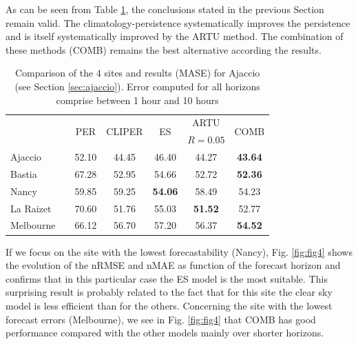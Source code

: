 As can be seen from Table \ref{tab:tab3}, the conclusions stated in the previous Section remain valid. The climatology-persistence systematically improves the persistence and is itself systematically improved by the ARTU method. The combination of these methods (COMB) remains the best alternative according the results.

\begin{table}[tb]
\centering
\begin{tabular}{@{}llccccc@{}}
	\toprule
	          &       & \multirow{2}{*}{PER} & \multirow{2}{*}{CLIPER} & \multirow{2}{*}{ES} &           ARTU & \multirow{2}{*}{COMB} \\
	          &       &                       &                           &                     &     $R=0.05$ &                       \\ \midrule
	Ajaccio   &   &                 52.10 &                     44.45 &               46.40 &          44.27 &        \textbf{43.64} \\ \addlinespace
	Bastia    &   &                 67.28 &                     52.95 &               54.66 &          52.72 &        \textbf{52.36} \\ \addlinespace
	Nancy     &   &                 59.85 &                     59.25 &      \textbf{54.06} &          58.49 &                 54.23 \\ \addlinespace
	La Raizet &   &                 70.60 &                     51.76 &               55.03 & \textbf{51.52} &                 52.77 \\ \addlinespace
	Melbourne &   &                 66.12 &                     56.70 &               57.20 &          56.37 &        \textbf{54.52} \\ \bottomrule
\end{tabular}
\caption{Comparison of the 4 sites and results (MASE) for Ajaccio (see Section \ref{sec:ajaccio}). Error computed for all horizons comprise between 1 hour and 10 hours}
\label{tab:tab3}
\end{table}

If we focus on the site with the lowest forecastability (Nancy), Fig. \ref{fig:fig4} shows the evolution of the nRMSE and nMAE as  function of the forecast horizon and confirms that in this particular case the ES model is the most suitable. This surprising result is probably related to the fact that for this site the clear sky model is less efficient than for the others. Concerning the site with the lowest forecast errors (Melbourne), we see in Fig. \ref{fig:fig4} that COMB has good performance compared with the other models mainly over shorter horizons.

